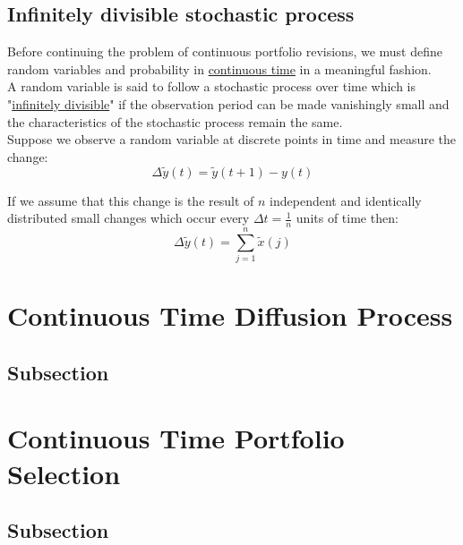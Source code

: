 \documentclass[
14pt,notheorems,hyperref={pdfauthor=whatever}
]{beamer}
\begin{document}
\subsection{Infinitely divisible stochastic process}
\begin{frame}
Before continuing the problem of continuous portfolio revisions, we must define random variables and probability in \underline{continuous time} in a meaningful fashion.\\
\hfill\break
A random variable is said to follow a stochastic process over time which is "\underline{infinitely divisible}" if the observation period can be made vanishingly small and the characteristics of the stochastic process remain the same.\\
\hfill\break
Suppose we observe a random variable at discrete points in time and measure the change:\\
\[\Delta \tilde y(t) = \tilde y(t+1)-y(t)\]
\end{frame}

\begin{frame}
If we assume that this change is the result of $n$ independent and identically distributed small changes which occur every $\Delta t = \frac{1}{n}$ units of time then:\\
\[\Delta \tilde y(t) = \sum_{j=1}^n \tilde x(j)\]
\end{frame}

\section{Continuous Time Diffusion Process}
\subsection{Subsection}

\section{Continuous Time Portfolio Selection}
\subsection{Subsection}
\end{document}

